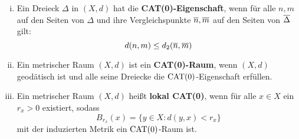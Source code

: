\begin{definition}
\label{def:1.7}
	\begin{enumerate}[(i)]
		\item Ein Dreieck $\Delta$ in $(X,d)$ hat die \textbf{CAT(0)-Eigenschaft}, wenn für alle $n,m$ auf den Seiten von $\Delta$ und ihre Vergleichspunkte $\overline{n},\overline{m}$ auf den Seiten von $\overline{\Delta}$ gilt: 
		\[
			d(n,m) \leq d_2(\overline{n},\overline{m})
		\]
		\item Ein metrischer Raum $(X,d)$ ist ein \textbf{CAT(0)-Raum}, wenn $(X,d)$ geodätisch ist und alle seine Dreiecke die $\operatorname{CAT(0)}$-Eigenschaft erfüllen.
		\item Ein metrischer Raum $(X,d)$ heißt \textbf{lokal CAT(0)}, wenn für alle $x \in X$ ein $r_x > 0$ existiert, sodass
		\[
			B_{r_x}(x) = \{y \in X : d(y,x) < r_x\}
		\]
		mit der induzierten Metrik ein $\operatorname{CAT(0)}$-Raum ist. 
	\end{enumerate}
\end{definition}

